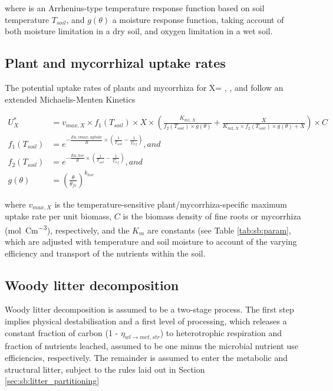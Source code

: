 where is an Arrhenius-type temperature response function based on soil temperature $T_{soil}$, and $g(\theta)$ a moisture response function, taking account of both moisture limitation in a dry soil, and oxygen limitation in a wet soil.

\subsection{Plant and mycorrhizal uptake rates}\label{sec:sb:simple_uptake}

The potential uptake rates of plants and mycorrhiza for X= , , and  follow an extended Michaelis-Menten Kinetics

\begin{subequations}\label{eq:sb:simple_potential_uptake}
\begin{align}
U^{*}_X &= v_{max,X} \times f_1(T_{soil}) \times X \times (\frac{K_{m1,X}}{f_2(T_{soil}) \times g(\theta)}+ \frac{X}{K_{m2,X} \times f_2(T_{soil}) \times g(\theta) +X}) \times C\\
f_1(T_{soil}) &= e^{-\frac{Ea,vmax,uptake}{R} \times (\frac{1}{T_{soil}} - \frac{1}{T^{\tau}_{ref}})}, and\\
f_2(T_{soil}) &= e^{-\frac{Ea,hsc}{R} \times (\frac{1}{T_{soil}} - \frac{1}{T^{\tau}_{ref}})}, and\\
g(\theta) &= (\frac{\theta}{\theta_{fc}})^{k_{hsc}}
\end{align}
\end{subequations}

where $v_{max,X}$ is the temperature-sensitive plant/mycorrhiza-specific maximum uptake rate per unit biomass, $C$ is the biomass density of fine roots or mycorrhiza (\unit{mol Cm^{-3}}), respectively, and the $K_m$ are constants (see Table \ref{tab:sb:param}, which are adjusted with temperature and soil moisture to account of the varying efficiency and transport of the nutrients within the soil.

\subsection{Woody litter decomposition}\label{sec:sb:woody_litter}

Woody litter decomposition is assumed to be a two-stage process. The first step implies physical destabilisation and a first level of processing, which releases a constant fraction of carbon (1 - $\eta_{wl \rightarrow met,str}$) to heterotrophic respiration and fraction of nutrients leached, assumed to be one minus the microbial nutrient use efficiencies, respectively. The remainder is assumed to enter the metabolic and structural litter, subject to the rules laid out in Section \ref{sec:sb:litter_partitioning} 

